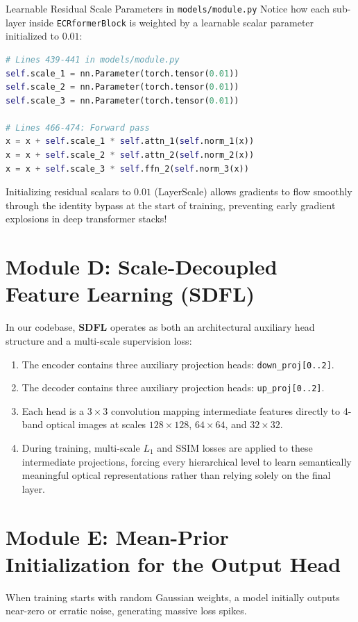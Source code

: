 \begin{codebox}{Learnable Residual Scale Parameters in \texttt{models/module.py}}
Notice how each sub-layer inside \texttt{ECRformerBlock} is weighted by a learnable scalar parameter initialized to $0.01$:
\begin{lstlisting}[language=Python]
# Lines 439-441 in models/module.py
self.scale_1 = nn.Parameter(torch.tensor(0.01))
self.scale_2 = nn.Parameter(torch.tensor(0.01))
self.scale_3 = nn.Parameter(torch.tensor(0.01))

# Lines 466-474: Forward pass
x = x + self.scale_1 * self.attn_1(self.norm_1(x))
x = x + self.scale_2 * self.attn_2(self.norm_2(x))
x = x + self.scale_3 * self.ffn_2(self.norm_3(x))
\end{lstlisting}
Initializing residual scalars to $0.01$ (LayerScale) allows gradients to flow smoothly through the identity bypass at the start of training, preventing early gradient explosions in deep transformer stacks!
\end{codebox}

\section{Module D: Scale-Decoupled Feature Learning (SDFL)}
In our codebase, \textbf{SDFL} operates as both an architectural auxiliary head structure and a multi-scale supervision loss:
\begin{enumerate}
    \item The encoder contains three auxiliary projection heads: \texttt{down\_proj[0..2]}.
    \item The decoder contains three auxiliary projection heads: \texttt{up\_proj[0..2]}.
    \item Each head is a $3 \times 3$ convolution mapping intermediate features directly to 4-band optical images at scales $128 \times 128$, $64 \times 64$, and $32 \times 32$.
    \item During training, multi-scale $L_1$ and SSIM losses are applied to these intermediate projections, forcing every hierarchical level to learn semantically meaningful optical representations rather than relying solely on the final layer.
\end{enumerate}

\section{Module E: Mean-Prior Initialization for the Output Head}
When training starts with random Gaussian weights, a model initially outputs near-zero or erratic noise, generating massive loss spikes.

